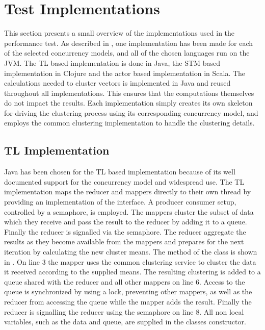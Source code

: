 \section{Test Implementations}
This section presents a small overview of the implementations used in the performance test. As described in , one implementation has been made for each of the selected concurrency models, and all of the chosen languages run on the \ac{JVM}. The \ac{TL} based implementation is done in Java, the \ac{STM} based implementation in Clojure and the actor based implementation in Scala. The calculations needed to cluster vectors is implemented in Java and reused throughout all implementations. This ensures that the computations themselves do not impact the results. Each implementation simply creates its own skeleton for driving the clustering process using its corresponding concurrency model, and employs the common clustering implementation to handle the clustering details. 

\subsection{\ac{TL} Implementation}
Java has been chosen for the \ac{TL} based implementation because of its well documented support for the concurrency model and widespread use. The \ac{TL} implementation maps the reducer and mappers directly to their own thread by providing an implementation of the  interface. A producer consumer setup, controlled by a semaphore, is employed. The mappers cluster the subset of data which they receive and pass the result to the reducer by adding it to a queue. Finally the reducer is signalled via the semaphore. The reducer aggregate the results as they become available from the mappers  and prepares for the next iteration by calculating the new cluster means. The  method of the  class is shown in . On line 3 the mapper uses the common clustering service to cluster the data it received according to the supplied means. The resulting clustering is added to a queue shared with the reducer and all other mappers on line 6. Access to the queue is synchronized by using a lock, preventing other mappers, as well as the reducer from accessing the queue while the mapper adds the result. Finally the reducer is signalling the reducer using the semaphore on line 8. All non local variables, such as the data and queue, are supplied in the  classes constructor. 

